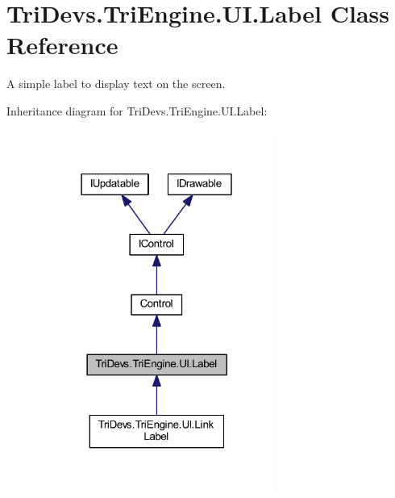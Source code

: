 \hypertarget{class_tri_devs_1_1_tri_engine_1_1_u_i_1_1_label}{\section{Tri\-Devs.\-Tri\-Engine.\-U\-I.\-Label Class Reference}
\label{class_tri_devs_1_1_tri_engine_1_1_u_i_1_1_label}
}


A simple label to display text on the screen.  




Inheritance diagram for Tri\-Devs.\-Tri\-Engine.\-U\-I.\-Label\-:
\nopagebreak
\begin{figure}[H]
\begin{center}
\leavevmode
\includegraphics[width=219pt]{class_tri_devs_1_1_tri_engine_1_1_u_i_1_1_label__inherit__graph}
\end{center}
\end{figure}


